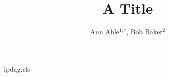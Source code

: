 \begin{filecontents*}[overwrite]{ipdag.cls}
\renewcommand{\author}[1]{{\raggedright #1\par}}
\newcommand{\affil}[1]{{\small\raggedright #1}}
\end{filecontents*}
\documentclass{ipdag}

\title{A Title}
\author{Ann Able$^{1,\dagger}$, Bob Baker$^{2}$}




\maketitle
Text.

